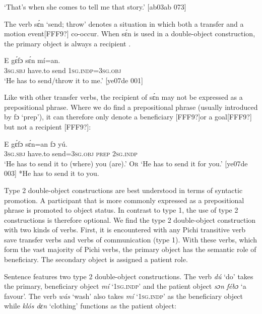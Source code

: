 \glt ‘That’s when she comes to tell me that story.’ [ab03ab 073]
\z

The verb sɛ́n ‘send; throw’ denotes a situation in which both a transfer and a motion event[FFF9?] co-occur. When sɛ́n is used in a double-object construction, the primary object is always a recipient . 


\ea%
    \label{ex:key:1208}
    \gll E    gɛ́fɔ    sɛ́n    mí=an.\\
\textsc{3sg.sbj}  have.to  send  \textsc{1sg.indp}=\textsc{3sg.obj}\\

\glt ‘He has to send/throw it to me.’ [ye07de 001]
\z

Like with other transfer verbs, the recipient of sɛ́n may not be expressed as a prepositional phrase. Where we do find a prepositional phrase (usually introduced by fɔ ‘prep’), it can therefore only denote a beneficiary [FFF9?]or a goal[FFF9?] but not a recipient [FFF9?]:


\ea%
    \label{ex:key:1209}
    \gll E    gɛ́fɔ    sɛ́n=an    fɔ  yú.\\
\textsc{3sg.sbj}  have.to  send=\textsc{3sg.obj}  \textsc{prep}  \textsc{2sg.indp}\\

\glt 
 ‘He has to send it to (where) you (are).’ \textsc{Or} ‘He has to send it for you.’ [ye07de 003]
*He has to send it to you. 
\z

Type 2 double-object constructions are best understood in terms of syntactic promotion. A participant that is more commonly expressed as a prepositional phrase is promoted to object status. In contrast to type 1, the use of type 2 constructions is therefore optional. We find the type 2 double-object construction with two kinds of verbs. First, it is encountered with any Pichi transitive verb save transfer verbs and verbs of communication (type 1). With these verbs, which form the vast majority of Pichi verbs, the primary object has the semantic role of beneficiary. The secondary object is assigned a patient role. 


Sentence  features two type 2 double-object constructions. The verb \textit{dú} ‘do’ takes the primary, beneficiary object \textit{mí} ‘\textsc{1sg.indp}’ and the patient object \textit{sɔn fébɔ} ‘a favour’.\textit{} The verb \textit{wás} ‘wash’ also takes \textit{mí} ‘\textsc{1sg.indp}’ as the beneficiary object while \textit{klós dɛn} ‘clothing’ functions as the patient object: 



